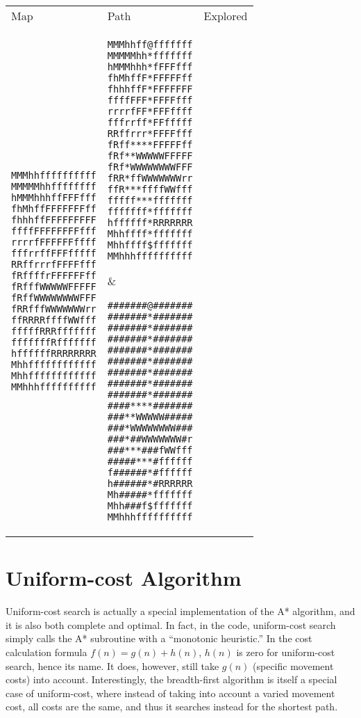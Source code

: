 \documentclass[12pt, article]{scrartcl}
\begin{document}
\begin{tabular}{p{2in} p{2in} p{2in}}
Map & Path & Explored \\

\begin{verbatim}
MMMhhffffffffff
MMMMMhhffffffff
hMMMhhhffFFFfff
fhMhffFFFFFFFff
fhhhffFFFFFFFFF
ffffFFFFFFFFfff
rrrrfFFFFFFffff
fffrrffFFFfffff
RRffrrrfFFFFfff
fRffffrFFFFFFff
fRfffWWWWWFFFFF
fRffWWWWWWWWFFF
fRRfffWWWWWWWrr
ffRRRRffffWWfff
fffffRRRfffffff
fffffffRfffffff
hffffffRRRRRRRR
Mhhffffffffffff
Mhhffffffffffff
MMhhhffffffffff
\end{verbatim}
&
\begin{verbatim}
MMMhhff@fffffff
MMMMMhh*fffffff
hMMMhhh*fFFFfff
fhMhffF*FFFFFff
fhhhffF*FFFFFFF
ffffFFF*FFFFfff
rrrrfFF*FFFffff
fffrrff*FFfffff
RRffrrr*FFFFfff
fRff****FFFFFff
fRf**WWWWWFFFFF
fRf*WWWWWWWWFFF
fRR*ffWWWWWWWrr
ffR***ffffWWfff
fffff***fffffff
fffffff*fffffff
hffffff*RRRRRRR
Mhhffff*fffffff
Mhhffff$fffffff
MMhhhffffffffff
\end{verbatim}
&
\begin{verbatim}
#######@#######
#######*#######
#######*#######
#######*#######
#######*#######
#######*#######
#######*#######
#######*#######
#######*#######
####****#######
###**WWWWW#####
###*WWWWWWWW###
###*##WWWWWWW#r
###***###fWWfff
#####***#ffffff
f######*#ffffff
h######*#RRRRRR
Mh#####*fffffff
Mhh###f$fffffff
MMhhhffffffffff
\end{verbatim}
\end{tabular}
\section{Uniform-cost Algorithm}
Uniform-cost search is actually a special implementation of the A* algorithm, and it is also both complete and optimal. In fact, in the code, uniform-cost search simply calls the A* subroutine with a ``monotonic heuristic.'' In the cost calculation formula $f(n) = g(n) + h(n)$, $h(n)$ is zero for uniform-cost search, hence its name. It does, however, still take $g(n)$ (specific movement costs) into account. Interestingly, the breadth-first algorithm is itself a special case of uniform-cost, where instead of taking into account a varied movement cost, all costs are the same, and thus it searches instead for the shortest path.
\end{document}
